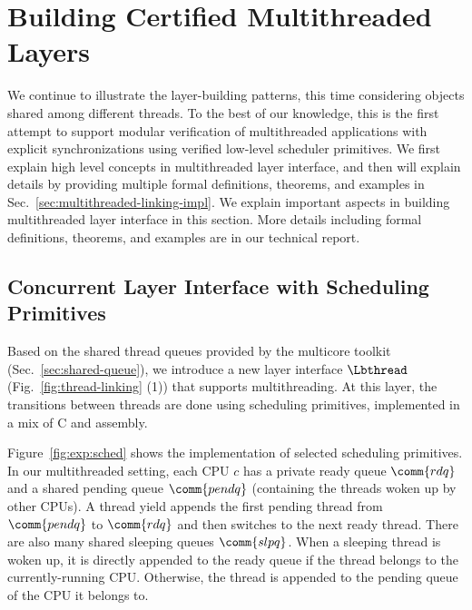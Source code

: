 \begin{flushleft}

\end{flushleft}\section{Building Certified Multithreaded Layers}
\label{sec:multithreaded-layers}
We continue to illustrate the layer-building patterns, this time
considering objects shared among different threads.
To the best of our knowledge, this is the first attempt to support modular verification
of multithreaded applications with explicit synchronizations using verified
low-level scheduler primitives. 
\ifTRthen
We first explain high level concepts in multithreaded layer interface, and then will explain details by providing 
multiple formal definitions, theorems, and examples in Sec.~\ref{sec:multithreaded-linking-impl}.
\else
We explain important aspects in building multithreaded layer interface in this section.
More details including  formal definitions, theorems, and examples are in our technical report.
\fi

\vspace{-5pt}
\subsection{Concurrent Layer Interface with Scheduling Primitives}\label{subsec:pbthreadlayer}
Based on the shared thread queues provided by the multicore
toolkit (Sec.~\ref{sec:shared-queue}),
we introduce a new  layer interface
$\Lbthread$ (Fig.~\ref{fig:thread-linking} (1))
that supports multithreading.
At this layer, the transitions between threads are done using
scheduling primitives,
implemented in a mix of
C and assembly.

Figure~\ref{fig:exp:sched} shows the implementation
of selected scheduling primitives.
In our multithreaded setting, each CPU $c$ has a private ready queue $\comm{rdq}$ 
and a shared pending queue $\comm{pendq}$ (containing the threads woken up by other CPUs). 
A thread yield appends the first pending thread from
 $\comm{pendq}$ to $\comm{rdq}$ and then
switches to the next ready thread. 
There are also many shared sleeping queues
$\comm{slpq}$. 
When a sleeping thread is woken up,
it is directly appended
to the ready queue if the thread belongs to the currently-running CPU. 
Otherwise, the thread
is appended to the pending queue of the CPU it belongs to.

